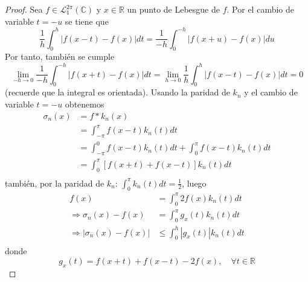 \documentclass[12pt]{report}
\newcounter{it}
\theoremstyle{largebreak}
\renewcommand{\leq}{\ensuremath{\leqslant}}
\newcommand\abs[1]{\ensuremath{\left|#1\right|}}
\begin{document}
    \begin{proof}
        Sea $f\in\mathcal{L}_1^{2\pi}(\mathbb{C})$ y $x\in\mathbb{R}$ un punto de Lebesgue de $f$. Por el cambio de variable $t=-u$ se tiene que
        \begin{equation*}
            \frac{1}{h}\int_0^h\abs{f(x-t)-f(x)}dt=\frac{1}{-h}\int_0^{-h}\abs{f(x+u)-f(x)}du
        \end{equation*}
        Por tanto, también se cumple
        \begin{equation*}
            \lim_{ -h\rightarrow0}\frac{1}{-h}\int_0^{-h}\abs{f(x+t)-f(x)}dt=\lim_{ h\rightarrow0}\frac{1}{h}\int_0^h\abs{f(x-t)-f(x)}dt=0
        \end{equation*}
        (recuerde que la integral es orientada). Usando la paridad de $k_n$ y el cambio de variable $t=-u$ obtenemos
        \begin{equation*}
            \begin{split}
                \sigma_n(x)&=f*k_n(x)\\
                &=\int_{-\pi}^{\pi}f(x-t)k_n(t)dt\\
                &=\int_{-\pi}^{0}f(x-t)k_n(t)dt+\int_{0}^{\pi}f(x-t)k_n(t)dt\\
                &=\int_{0}^{\pi}\left[f(x+t)+f(x-t)\right]k_n(t)dt\\
            \end{split}
        \end{equation*}
        también, por la paridad de $k_n$: $\int_{0}^{\pi}k_n(t)dt=\frac{1}{2}$, luego
        \begin{equation*}
            \begin{split}
                f(x)&=\int_0^{\pi}2f(x)k_n(t)dt\\
                \Rightarrow \sigma_n(x)-f(x)&=\int_0^{\pi}g_x(t)k_n(t)dt\\
                \Rightarrow \abs{\sigma_n(x)-f(x)}&\leq\int_0^h\abs{g_x(t)}k_n(t)dt\\
            \end{split}
        \end{equation*}
        donde
        \begin{equation*}
            g_x(t)=f(x+t)+f(x-t)-2f(x),\quad\forall t\in\mathbb{R}
        \end{equation*}
        

\end{proof}
\end{document}

